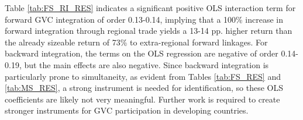 \documentclass[a4paper]{article}
\begin{document}
Table \ref{tab:FS_RI_RES} indicates a significant positive OLS interaction term for forward GVC integration of order 0.13-0.14, implying that a 100\% increase in forward integration through regional trade yields a 13-14 pp. higher return than the already sizeable return of 73\% to extra-regional forward linkages. For backward integration, the terms on the OLS regression are negative of order 0.14-0.19, but the main effects are also negative. Since backward integration is particularly prone to simultaneity, as evident from Tables \ref{tab:FS_RES} and \ref{tab:MS_RES}, a strong instrument is needed for identification, so these OLS coefficients are likely not very meaningful. Further work is required to create stronger instruments for GVC participation in developing countries. 


\begin{table}[h!]
   \caption{\label{tab:FS_RI_RES} \textsc{EAC5 Regional Integration via RVCs Regressions}}
   \centering
\end{table}
\end{document}
